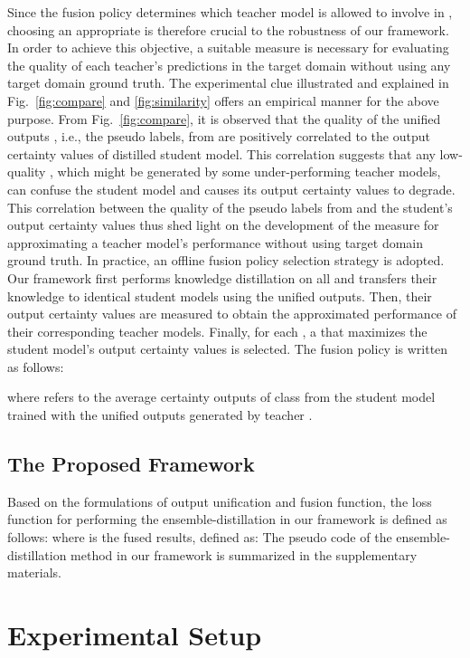 \documentclass[final]{cvpr}
\begin{document}
Since the fusion policy  determines which teacher model is allowed to involve in , choosing an appropriate  is therefore crucial to the robustness of our framework. In order to achieve this objective, a suitable measure is necessary for evaluating the quality of each teacher's predictions in the target domain without using any target domain ground truth. The experimental clue illustrated and explained in Fig.~\ref{fig:compare} and \ref{fig:similarity} offers an empirical manner for the above purpose. From Fig.~\ref{fig:compare}, it is observed that the quality of the unified outputs , i.e., the pseudo labels, from  are positively correlated to the output certainty values of distilled student model. This correlation suggests that any low-quality , which might be generated by some under-performing teacher models, can confuse the student model and causes its output certainty values to degrade. This correlation between the quality of the pseudo labels from  and the student's output certainty values thus shed light on the development of the measure for approximating a teacher model's performance without using target domain ground truth. In practice, an offline fusion policy selection strategy is adopted. Our framework first performs knowledge distillation on all  and transfers their knowledge to  identical student models using the unified outputs. Then, their output certainty values are measured to obtain the approximated performance of their corresponding teacher models. Finally, for each , a  that maximizes the student model's output certainty values is selected. The fusion policy  is written as follows:

where  refers to the average certainty outputs of class  from the student model trained with the unified outputs generated by teacher .

\subsection{The Proposed Framework}
\label{sec:method:ensemble_distillation}
Based on the formulations of output unification and fusion function, the loss function  for performing the ensemble-distillation in our framework is defined as follows:
 where  is the fused results, defined as:
 The pseudo code of the ensemble-distillation method in our framework is summarized in the supplementary materials. 

\section{Experimental Setup}
\label{sec:setup}
\end{document}
